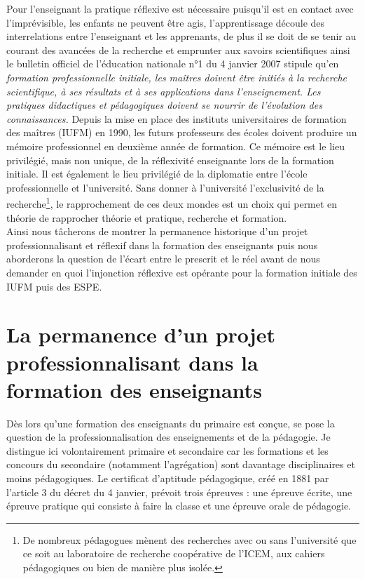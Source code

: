 \documentclass[a4paper,11pt]{article}
\begin{document}
Pour l'enseignant la pratique réflexive est nécessaire puisqu'il est en contact avec l'imprévisible, les enfants ne peuvent être agis, l'apprentissage découle des interrelations entre l'enseignant et les apprenants, de plus il se doit de se tenir au courant des avancées de la recherche et emprunter aux savoirs scientifiques ainsi le bulletin officiel de l'éducation nationale n°1 du 4 janvier 2007 stipule qu'en \emph{formation professionnelle initiale, les maîtres doivent être initiés à la recherche scientifique, à ses résultats et à ses applications dans l'enseignement. Les pratiques didactiques et pédagogiques doivent se nourrir de l'évolution des connaissances.} Depuis la mise en place des instituts universitaires de formation des maîtres (IUFM) en 1990, les futurs professeurs des écoles doivent produire un mémoire professionnel en deuxième année de formation. Ce mémoire est le lieu privilégié, mais non unique, de la réflexivité enseignante lors de la formation initiale. Il est également le lieu privilégié de la diplomatie entre l'école professionnelle et l'université. Sans donner à l'université l'exclusivité de la recherche\footnote{De nombreux pédagogues mènent des recherches avec ou sans l'université que ce soit au laboratoire de recherche coopérative de l'ICEM, aux cahiers pédagogiques ou bien de manière plus isolée.}, le rapprochement de ces deux mondes est un choix qui permet en théorie de rapprocher théorie et pratique, recherche et formation. 
\\

Ainsi nous tâcherons de montrer la permanence historique d'un projet professionnalisant et réflexif dans la formation des enseignants puis nous aborderons la question de l'écart entre le prescrit et le réel avant de nous demander en quoi l'injonction réflexive est opérante pour la formation initiale des IUFM puis des ESPE.


\part{La permanence d'un projet professionnalisant dans la formation des enseignants}

Dès lors qu'une formation des enseignants du primaire est conçue, se pose la question de la professionnalisation des enseignements et de la pédagogie. Je distingue ici volontairement primaire et secondaire car les formations et les concours du secondaire (notamment l'agrégation) sont davantage disciplinaires et moins pédagogiques. Le certificat d'aptitude pédagogique, créé en 1881 par l'article 3 du décret du 4 janvier, prévoit trois épreuves : une épreuve écrite, une épreuve pratique qui consiste à faire la classe et une épreuve orale de pédagogie.    
\end{document}
